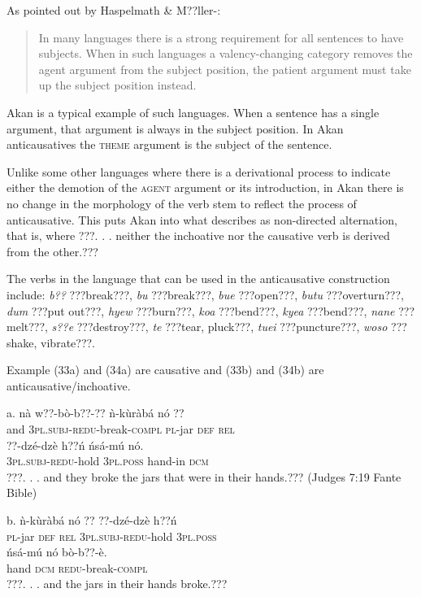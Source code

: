 \documentclass[output=paper]{langsci/langscibook}
\begin{document}
As pointed out by Haspelmath \& M??ller-\citet[1132]{Bardey2004}: 

\begin{quote}
In many languages there is a strong requirement for all sentences to have subjects. When in such languages a valency-changing category removes the agent argument from the subject position, the patient argument must take up the subject position instead.
\end{quote}

Akan is a typical example of such languages. When a sentence has a single argument, that argument is always in the subject position. In Akan anticausatives the \textsc{theme} argument is the subject of the sentence. 

Unlike some other languages where there is a derivational process to indicate either the demotion of the \textsc{agent} argument or its introduction, in Akan there is no change in the morphology of the verb stem to reflect the process of anticausative. This puts Akan into what \citet[91]{Haspelmath1993} describes as non-directed alternation, that is, where ???. . . neither the inchoative nor the causative verb is derived from the other.???

The verbs in the language that can be used in the anticausative construction include: \emph{b??} ???break???, \emph{bu} ???break???, \emph{bue} ???open???, \emph{butu} ???overturn???, \emph{dum} ???put out???, \emph{hyew} ???burn???, \emph{koa} ???bend???, \emph{kyea} ???bend???, \emph{nane} ???melt???, \emph{s??e} ???destroy???, \emph{te} ???tear, pluck???, \emph{tuei} ???puncture???, \emph{woso} ???shake, vibrate???. 

Example (33a) and (34a) are causative and (33b) and (34b) are anticausative/inchoative.

\ea
\gll a.  nà  w??-bò-b??-??       ǹ-k\`{u}ràbá   nó  ?? \\
       and  \textsc{3pl.subj}{}-\textsc{redu}{}-break\textsc{{}-compl}  \textsc{pl}{}-jar    \textsc{def}  \textsc{rel}  \\
\gll   ??{}-dzé-dzè    h??ń    ńsá-mú    nó.   \\
             \textsc{3pl.subj}{}-\textsc{redu}{}-hold  \textsc{3pl.poss}  hand-in  \textsc{dcm}\\
\glt ???. . .  and they broke the jars that were in their hands.??? (Judges 7:19 Fante Bible)
\z

\ea
\gll  b.  ǹ-k\`{u}ràbá   nó  ??  ??{}-dzé-dzè    h??ń  \\
       \textsc{pl}{}-jar    \textsc{def}  \textsc{rel}  \textsc{3pl.subj}{}-\textsc{redu}{}-hold  \textsc{3pl.poss}\\
\gll   ńsá-mú    nó    bò-b??-è.\\
       hand    \textsc{dcm}    \textsc{redu}{}-break-\textsc{compl}\\
\glt ???. . .  and the jars in their hands broke.???
\z
\end{document}
